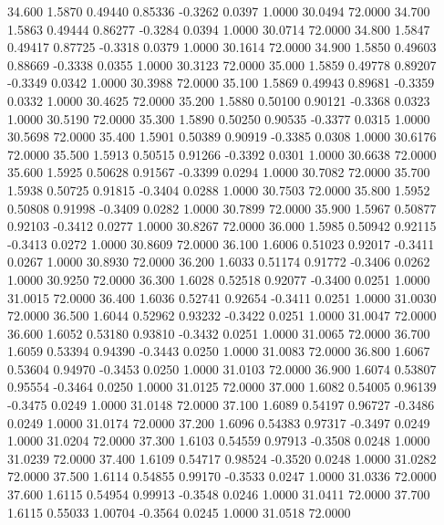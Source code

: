   34.600   1.5870   0.49440   0.85336  -0.3262   0.0397   1.0000  30.0494  72.0000
  34.700   1.5863   0.49444   0.86277  -0.3284   0.0394   1.0000  30.0714  72.0000
  34.800   1.5847   0.49417   0.87725  -0.3318   0.0379   1.0000  30.1614  72.0000
  34.900   1.5850   0.49603   0.88669  -0.3338   0.0355   1.0000  30.3123  72.0000
  35.000   1.5859   0.49778   0.89207  -0.3349   0.0342   1.0000  30.3988  72.0000
  35.100   1.5869   0.49943   0.89681  -0.3359   0.0332   1.0000  30.4625  72.0000
  35.200   1.5880   0.50100   0.90121  -0.3368   0.0323   1.0000  30.5190  72.0000
  35.300   1.5890   0.50250   0.90535  -0.3377   0.0315   1.0000  30.5698  72.0000
  35.400   1.5901   0.50389   0.90919  -0.3385   0.0308   1.0000  30.6176  72.0000
  35.500   1.5913   0.50515   0.91266  -0.3392   0.0301   1.0000  30.6638  72.0000
  35.600   1.5925   0.50628   0.91567  -0.3399   0.0294   1.0000  30.7082  72.0000
  35.700   1.5938   0.50725   0.91815  -0.3404   0.0288   1.0000  30.7503  72.0000
  35.800   1.5952   0.50808   0.91998  -0.3409   0.0282   1.0000  30.7899  72.0000
  35.900   1.5967   0.50877   0.92103  -0.3412   0.0277   1.0000  30.8267  72.0000
  36.000   1.5985   0.50942   0.92115  -0.3413   0.0272   1.0000  30.8609  72.0000
  36.100   1.6006   0.51023   0.92017  -0.3411   0.0267   1.0000  30.8930  72.0000
  36.200   1.6033   0.51174   0.91772  -0.3406   0.0262   1.0000  30.9250  72.0000
  36.300   1.6028   0.52518   0.92077  -0.3400   0.0251   1.0000  31.0015  72.0000
  36.400   1.6036   0.52741   0.92654  -0.3411   0.0251   1.0000  31.0030  72.0000
  36.500   1.6044   0.52962   0.93232  -0.3422   0.0251   1.0000  31.0047  72.0000
  36.600   1.6052   0.53180   0.93810  -0.3432   0.0251   1.0000  31.0065  72.0000
  36.700   1.6059   0.53394   0.94390  -0.3443   0.0250   1.0000  31.0083  72.0000
  36.800   1.6067   0.53604   0.94970  -0.3453   0.0250   1.0000  31.0103  72.0000
  36.900   1.6074   0.53807   0.95554  -0.3464   0.0250   1.0000  31.0125  72.0000
  37.000   1.6082   0.54005   0.96139  -0.3475   0.0249   1.0000  31.0148  72.0000
  37.100   1.6089   0.54197   0.96727  -0.3486   0.0249   1.0000  31.0174  72.0000
  37.200   1.6096   0.54383   0.97317  -0.3497   0.0249   1.0000  31.0204  72.0000
  37.300   1.6103   0.54559   0.97913  -0.3508   0.0248   1.0000  31.0239  72.0000
  37.400   1.6109   0.54717   0.98524  -0.3520   0.0248   1.0000  31.0282  72.0000
  37.500   1.6114   0.54855   0.99170  -0.3533   0.0247   1.0000  31.0336  72.0000
  37.600   1.6115   0.54954   0.99913  -0.3548   0.0246   1.0000  31.0411  72.0000
  37.700   1.6115   0.55033   1.00704  -0.3564   0.0245   1.0000  31.0518  72.0000
